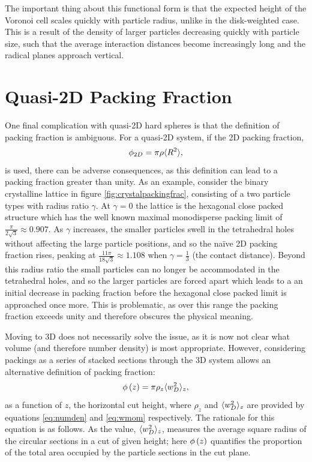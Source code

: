 The important thing about this functional form is that the expected height of the Voronoi cell scales quickly with particle radius, unlike in the disk\--weighted case.
This is a result of the density of larger particles decreasing quickly with particle size, such that the average interaction distances become increasingly long and the radical planes approach vertical.

\section{Quasi\--2D Packing Fraction}
\label{s:qtdpackingfrac}

One final complication with quasi\--2D hard spheres is that the definition of packing fraction is ambiguous.
For a quasi\--2D system, if the 2D packing fraction,
\begin{equation}
	\label{eq:simplepackingfrac}
	\phi_{2D}=\pi\rho\langle R^2\rangle,
\end{equation}
is used, there can be adverse consequences, as this definition can lead to a packing fraction greater than unity.
As an example, consider the binary crystalline lattice in figure \ref{fig:crystalpackingfrac}, consisting of a two particle types with radius ratio $\gamma$.
At $\gamma=0$ the lattice is the hexagonal close packed structure which has the well known maximal monodisperse packing limit of $\frac{\pi}{2\sqrt{3}}\approx0.907$.
As $\gamma$ increases, the smaller particles swell in the tetrahedral holes without affecting the large particle positions, and so the na\"ive 2D packing fraction rises, peaking at $\frac{11\pi}{18\sqrt{3}}\approx1.108$ when $\gamma=\frac{1}{3}$ (the contact distance).
Beyond this radius ratio the small particles can no longer be accommodated in the tetrahedral holes, and so the larger particles are forced apart which leads to a an initial decrease in packing fraction before the hexagonal close packed limit is approached once more.
This is problematic, as over this range the packing fraction exceeds unity and therefore obscures the physical meaning.

Moving to 3D does not necessarily solve the issue, as it is now not clear what volume (and therefore number density) is most appropriate.
However, considering \qtd{} packings as a series of stacked sections through the 3D system allows an alternative definition of packing fraction:
\begin{equation}
	\label{eq:altpackingfrac}
	\phi\left(z\right) = \pi\rho_z\langle w_D^2 \rangle_z,
\end{equation}
as a function of $z$, the horizontal cut height, where $\rho_z$ and $\langle w_D^2 \rangle_z$ are provided by equations \eqref{eq:numden} and \eqref{eq:wmom} respectively.
The rationale for this equation is as follows. 
As the value, $\langle w_D^2 \rangle_z$, measures the average square radius of the circular sections in a cut of given height; here $\phi\left(z\right)$ quantifies the proportion of the total area occupied by the particle sections in the cut plane.

